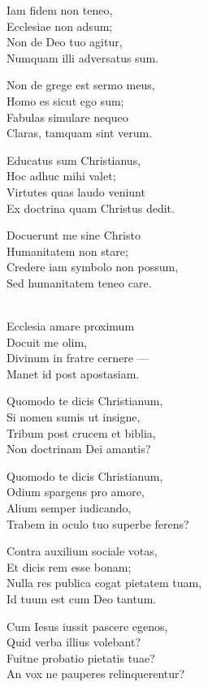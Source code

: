 \begin{lyrics}
Iam fidem non teneo,\\
Ecclesiae non adsum;\\
Non de Deo tuo agitur,\\
Numquam illi adversatus sum.

Non de grege est sermo meus,\\
Homo es sicut ego sum;\\
Fabulas simulare nequeo\\
Claras, tamquam sint verum.

Educatus sum Christianus,\\
Hoc adhuc mihi valet;\\
Virtutes quas laudo veniunt\\
Ex doctrina quam Christus dedit.

Docuerunt me sine Christo\\
Humanitatem non stare;\\
Credere iam symbolo non possum,\\
Sed humanitatem teneo care.

\\
Ecclesia amare proximum\\
Docuit me olim,\\
Divinum in fratre cernere —\\
Manet id post apostasiam.

Quomodo te dicis Christianum,\\
Si nomen sumis ut insigne,\\
Tribum post crucem et biblia,\\
Non doctrinam Dei amantis?

Quomodo te dicis Christianum,\\
Odium spargens pro amore,\\
Alium semper iudicando,\\
Trabem in oculo tuo superbe ferens?

Contra auxilium sociale votas,\\
Et dicis rem esse bonam;\\
Nulla res publica cogat pietatem tuam,\\
Id tuum est cum Deo tantum.

Cum Iesus iussit pascere egenos,\\
Quid verba illius volebant?\\
Fuitne probatio pietatis tuae?\\
An vox ne pauperes relinquerentur?


\end{lyrics}
